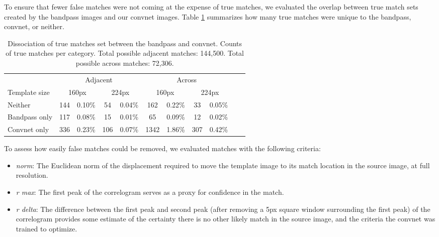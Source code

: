 \documentclass{article}
\begin{document}
To ensure that fewer false matches were not coming at the expense of true matches, we evaluated the overlap between true match sets created by the bandpass images and our convnet images. Table \ref{table:true_overlap} summarizes how many true matches were unique to the bandpass, convnet, or neither.

\begin{table}[h]
\caption{Dissociation of true matches set between the bandpass and convnet. Counts of true matches per category. Total possible adjacent matches: 144,500. Total possible across matches: 72,306.}
\centering
\small
    \begin{tabular}{l*{9}{c}r}
        \toprule
        &  \multicolumn{4}{c}{Adjacent}   &  \multicolumn{4}{c}{Across}\\
        \cmidrule{2-9}
        Template size    & \multicolumn{2}{c}{160px}  & \multicolumn{2}{c}{224px} & \multicolumn{2}{c}{160px} & \multicolumn{2}{c}{224px} \\
        \hline
        Neither         & 144 & 0.10\% & 54 & 0.04\% & 162 & 0.22\% & 33 & 0.05\% &  \\
        Bandpass only             & 117 & 0.08\% & 15 & 0.01\% & 65 & 0.09\% & 12 & 0.02\% \\
        Convnet only        & 336 & 0.23\% & 106 & 0.07\% & 1342 & 1.86\% & 307 & 0.42\% \\
        \bottomrule
    \end{tabular}

\label{table:true_overlap}
\end{table}

To assess how easily false matches could be removed, we evaluated matches with the following criteria:
\begin{itemize}
    \item \textit{norm}: The Euclidean norm of the displacement required to move the template image to its match location in the source image, at full resolution.
    \item \textit{r max}: The first peak of the correlogram serves as a proxy for confidence in the match.
    \item \textit{r delta}: The difference between the first peak and second peak (after removing a 5px square window surrounding the first peak) of the correlogram provides some estimate of the certainty there is no other likely match in the source image, and the criteria the convnet was trained to optimize.
\end{itemize}
\end{document}

